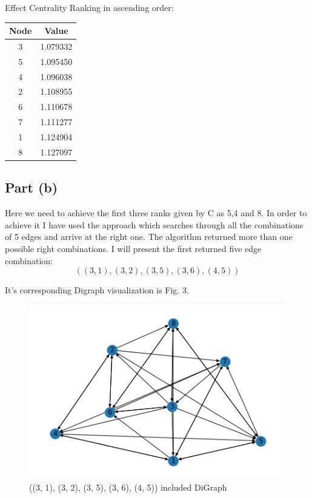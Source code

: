 \documentclass[conference]{IEEEtran}
\begin{document}
Effect Centrality Ranking in ascending order:

\begin{center}
 \begin{tabular}{||c c||} 
 \hline
 Node & Value \\ [0.5ex] 
 \hline\hline
 3 & 1.079332\\ 
 \hline
 5 & 1.095450\\
 \hline
 4 & 1.096038\\
 \hline
 2 & 1.108955\\
 \hline
 6 & 1.110678\\
 \hline
 7 & 1.111277\\
 \hline
 1 & 1.124904\\
 \hline
 8 & 1.127097\\ [1ex] 
 \hline
\end{tabular}
\end{center}

\subsection{Part (b)}
Here we need to achieve the first three ranks given by C as 5,4 and 8. In order to achieve it I have used the approach which searches through all the combinations of 5 edges and arrive at the right one. The algorithm returned more than one possible right combinations. I will present the first returned five edge combination:
\[((3, 1), (3, 2), (3, 5), (3, 6), (4, 5))\]

It's corresponding Digraph visualization is Fig. 3.
\begin{figure}[htbp]
\centerline{\includegraphics[scale=0.6]{img42.png}}
\caption{((3, 1), (3, 2), (3, 5), (3, 6), (4, 5)) included DiGraph}
\label{fig2}
\end{figure}
\end{document}
